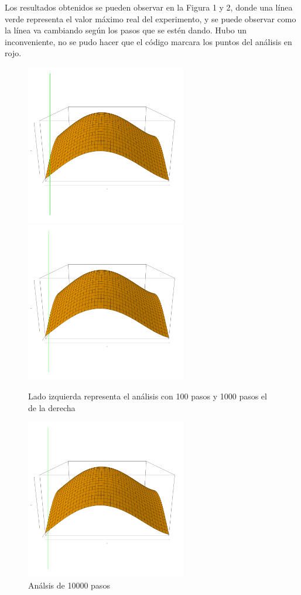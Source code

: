 \documentclass{article}
\begin{document}
Los resultados obtenidos se pueden observar en la Figura 1 y 2, donde una línea verde representa el valor máximo real del experimento, y se puede observar como la línea va cambiando según los pasos que se estén dando. Hubo un inconveniente, no se pudo hacer que el código marcara los puntos del análisis en rojo.
\begin{figure}[H]
\centering
\includegraphics[width=7cm]{grafica_3D100.png}       \includegraphics[width=7cm]{grafica_3D1000.png} 
\caption{Lado izquierda representa el análisis con 100 pasos y 1000 pasos el de la derecha}
\end{figure}

\begin{figure}[H]
\centering
\includegraphics[width=7cm]{grafica_3D10000.png}
 \caption{Análsis de 10000 pasos}
\end{figure}
\end{document}
